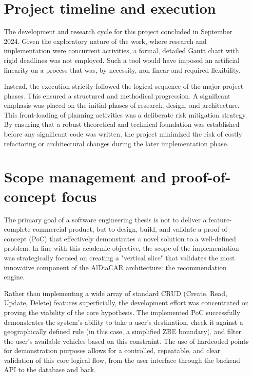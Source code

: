 \section{Project timeline and execution}

The development and research cycle for this project concluded in September 2024. Given the exploratory nature of the work, where research and implementation were concurrent activities, a formal, detailed Gantt chart with rigid deadlines was not employed. Such a tool would have imposed an artificial linearity on a process that was, by necessity, non-linear and required flexibility.

\textgap

Instead, the execution strictly followed the logical sequence of the major project phases. This ensured a structured and methodical progression. A significant emphasis was placed on the initial phases of research, design, and architecture. This front-loading of planning activities was a deliberate risk mitigation strategy. By ensuring that a robust theoretical and technical foundation was established before any significant code was written, the project minimized the risk of costly refactoring or architectural changes during the later implementation phase.

\section{Scope management and proof-of-concept focus}

The primary goal of a software engineering thesis is not to deliver a feature-complete commercial product, but to design, build, and validate a proof-of-concept (PoC) that effectively demonstrates a novel solution to a well-defined problem. In line with this academic objective, the scope of the implementation was strategically focused on creating a "vertical slice" that validates the most innovative component of the AlDiaCAR architecture: the recommendation engine.

\textgap

Rather than implementing a wide array of standard CRUD (Create, Read, Update, Delete) features superficially, the development effort was concentrated on proving the viability of the core hypothesis. The implemented PoC successfully demonstrates the system's ability to take a user's destination, check it against a geographically defined rule (in this case, a simplified ZBE boundary), and filter the user's available vehicles based on this constraint. The use of hardcoded points for demonstration purposes allows for a controlled, repeatable, and clear validation of this core logical flow, from the user interface through the backend API to the database and back.

